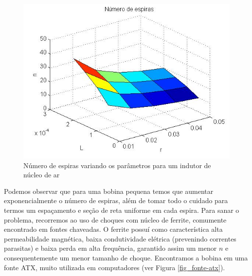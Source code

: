 \begin{figure}[htb]
\caption{\label{fig_comp-indutor}Número de espiras variando os parâmetros para um indutor de núcleo de ar}
\begin{center}
\includegraphics[scale=0.5]{images/comp-indutor.jpg}
\end{center}
\end{figure}

Podemos observar que para uma bobina pequena temos que aumentar exponencialmente o número de espiras, além de tomar todo o cuidado para termos um espaçamento e seção de reta uniforme em cada espira. Para sanar o problema, recorremos ao uso de choques com núcleo de ferrite, comumente encontrado em fontes chaveadas. O ferrite possuí como característica alta permeabilidade magnética, baixa condutividade elétrica (prevenindo correntes parasitas) e baixa perda em alta frequência, garantido assim um menor $n$ e consequentemente um menor tamanho de choque. Encontramos a bobina em uma fonte ATX, muito utilizada em computadores (ver Figura \ref{fig_fonte-atx}).

